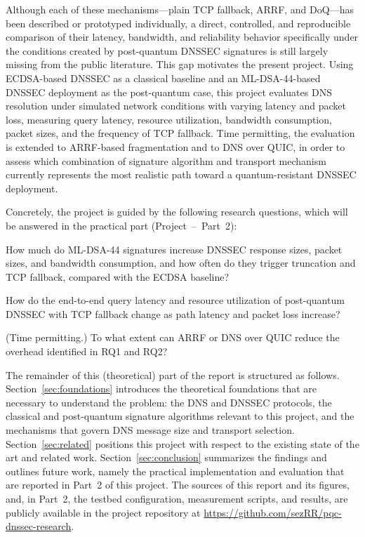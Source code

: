 \documentclass[conference]{IEEEtran}
\begin{document}
Although each of these mechanisms---plain TCP fallback, ARRF, and DoQ---has
been described or prototyped individually, a direct, controlled, and
reproducible comparison of their latency, bandwidth, and reliability behavior
specifically under the conditions created by post-quantum DNSSEC signatures is
still largely missing from the public literature. This gap motivates the
present project. Using ECDSA-based DNSSEC as a classical baseline and an
ML-DSA-44-based DNSSEC deployment as the post-quantum case, this project
evaluates DNS resolution under simulated network conditions with varying
latency and packet loss, measuring query latency, resource utilization,
bandwidth consumption, packet sizes, and the frequency of TCP fallback. Time
permitting, the evaluation is extended to ARRF-based fragmentation and to DNS
over QUIC, in order to assess which combination of signature algorithm and
transport mechanism currently represents the most realistic path toward a
quantum-resistant DNSSEC deployment.

Concretely, the project is guided by the following research questions, which
will be answered in the practical part (Project~--~Part~2):
\begin{IEEEdescription}
\item[\textbf{RQ1:}] How much do ML-DSA-44 signatures increase DNSSEC response
sizes, packet sizes, and bandwidth consumption, and how often do they trigger
truncation and TCP fallback, compared with the ECDSA baseline?
\item[\textbf{RQ2:}] How do the end-to-end query latency and resource
utilization of post-quantum DNSSEC with TCP fallback change as path latency and
packet loss increase?
\item[\textbf{RQ3:}] (Time permitting.) To what extent can ARRF or DNS over
QUIC reduce the overhead identified in RQ1 and RQ2?
\end{IEEEdescription}

The remainder of this (theoretical) part of the report is structured as
follows. Section~\ref{sec:foundations} introduces the theoretical foundations
that are necessary to understand the problem: the DNS and DNSSEC protocols, the
classical and post-quantum signature algorithms relevant to this project, and
the mechanisms that govern DNS message size and transport selection.
Section~\ref{sec:related} positions this project with respect to the existing
state of the art and related work. Section~\ref{sec:conclusion} summarizes
the findings and outlines future work, namely the practical implementation and
evaluation that are reported in Part~2 of this project.
The sources of this report and its figures, and, in Part~2, the testbed
configuration, measurement scripts, and results, are publicly available in the
project repository at \url{https://github.com/sezRR/pqc-dnssec-research}.
\end{document}
